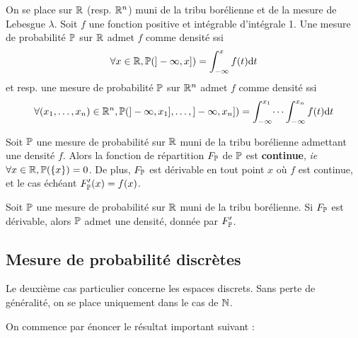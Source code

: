 \documentclass[../integ-proba.tex]{subfiles}
\begin{document}
    \begin{thm}
        On se place sur $\mathbb{R}$ (resp. $\mathbb{R}^n$) muni de la tribu borélienne et de la mesure de Lebesgue $\lambda$.
        Soit $f$ une fonction positive et intégrable d'intégrale 1.
        Une mesure de probabilité $\mathbb{P}$ sur $\mathbb{R}$ admet $f$ comme densité ssi
        \begin{displaymath}
            \forall x \in \mathbb{R}, \mathbb{P}(]-\infty, x]) = \int_{- \infty}^x f(t)\textnormal{d}t
        \end{displaymath}
        et resp. une mesure de probabilité $\mathbb{P}$ sur $\mathbb{R}^n$ admet $f$ comme densité ssi
        \begin{displaymath}
            \forall (x_1,\ldots,x_n) \in \mathbb{R}^n, \mathbb{P}(]-\infty, x_1], \ldots, ]-\infty, x_n]) = \int_{- \infty}^{x_1} \dots \int_{- \infty}^{x_n} f(t) \textnormal{d}t
        \end{displaymath}
    \end{thm}

    \begin{prop}
        \label{prop:continuite_fdrep_densite}
        Soit $\mathbb{P}$ une mesure de probabilité sur $\mathbb{R}$ muni de la tribu borélienne admettant une densité $f$.
        Alors la fonction de répartition $F_{\mathbb{P}}$ de $\mathbb{P}$ est \textbf{continue}, \textit{ie} $\forall x \in \mathbb{R}, \mathbb{P}(\left\{ x \right\}) = 0$.
        De plus, $F_{\mathbb{P}}$ est dérivable en tout point $x$ où $f$ est continue, et le cas échéant $F'_{\mathbb{P}}(x) = f(x)$.
    \end{prop}

    \begin{prop}
        Soit $\mathbb{P}$ une mesure de probabilité sur $\mathbb{R}$ muni de la tribu borélienne.
        Si $F_{\mathbb{P}}$ est dérivable, alors $\mathbb{P}$ admet une densité, donnée par $F'_{\mathbb{P}}$.
    \end{prop}



    \subsection{Mesure de probabilité discrètes}
    Le deuxième cas particulier concerne les espaces discrets.
    Sans perte de généralité, on se place uniquement dans le cas de $\mathbb{N}$.

    On commence par énoncer le résultat important suivant :
\end{document}
